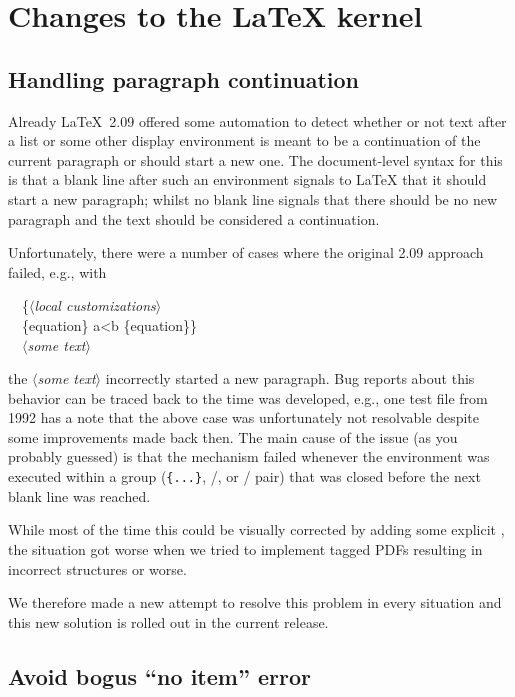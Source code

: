 \documentclass{ltnews}
\providecommand\meta[1]{$\langle$\textrm{\itshape#1}$\rangle$}
\begin{document}
\section{Changes to the \LaTeX{} kernel}

\subsection{Handling paragraph continuation}

Already \LaTeX~2.09 offered some automation to detect whether or not
text after a list or some other display environment is meant to be a
continuation of the current paragraph or should start a new one.  The
document-level syntax for this is that a blank line after such an
environment signals to \LaTeX{} that it should start a new paragraph;
whilst no blank line signals that there should be no new paragraph and
the text should be considered a continuation.

Unfortunately, there were a number of cases where the original 2.09
approach failed, e.g., with
\begin{flushleft}
  \ttfamily
\ \ \{\meta{local customizations}\\
\ \ \{equation\} a<b \{equation\}\} \\
\ \ \meta{some text}
\end{flushleft}
the \meta{some text} incorrectly started a new paragraph.  Bug reports
about this behavior can be traced back to the time \LaTeXe{} was
developed, e.g., one test file from 1992 has a note that the above
case was unfortunately not resolvable despite some improvements made
back then.  The main cause of the issue (as you probably guessed) is
that the mechanism failed whenever the environment was executed within
a group (\texttt{\{...\}}, /, or
/ pair) that was closed before the next blank
line was reached.

While most of the time this could be visually corrected by adding some
explicit , the situation got worse when we tried to
implement tagged PDFs resulting in incorrect structures or worse.

We therefore made a new attempt to resolve this problem in every
situation and this new solution is rolled out in the current release.


\subsection{Avoid bogus \enquote{no item} error}
\end{document}
